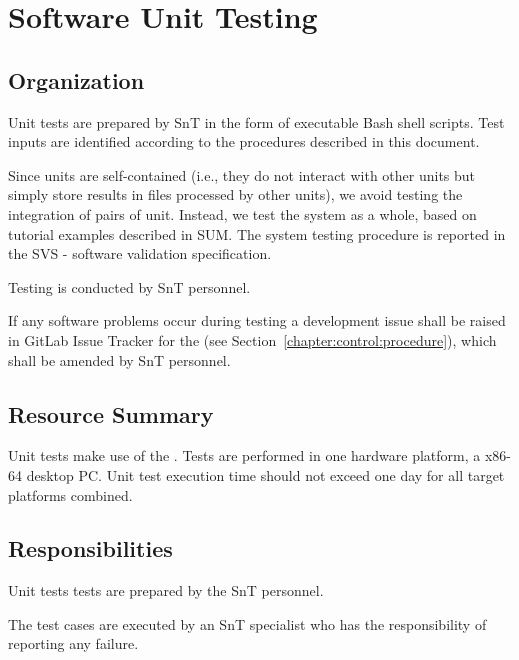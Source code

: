 
\chapter{Software Unit Testing}

\section{Organization}
\label{sec:SUTSIT:org}

Unit tests are prepared by SnT in the form of executable Bash shell scripts. Test inputs are identified according to the procedures described in this document.

Since units are self-contained (i.e., they do not interact with other units but simply store results in files processed by other units), we avoid testing the integration of pairs of unit. Instead, we test the system as a whole, based on tutorial examples described in SUM. The system testing procedure is reported in the SVS - software validation specification.

Testing is conducted by SnT personnel.

If any software problems occur during testing a development issue shall be raised in GitLab Issue Tracker for the \FAQAS (see Section~\ref{chapter:control:procedure}), which shall be amended by SnT personnel.



\section{Resource Summary}

Unit tests make use of the \FAQAS. Tests are performed in one hardware platform, a x86-64 desktop PC. Unit test execution time should not exceed one day for all target platforms combined.

\section{Responsibilities}

Unit tests tests are prepared by the SnT personnel.

The test cases are executed by an SnT specialist who has the responsibility of reporting any failure.

